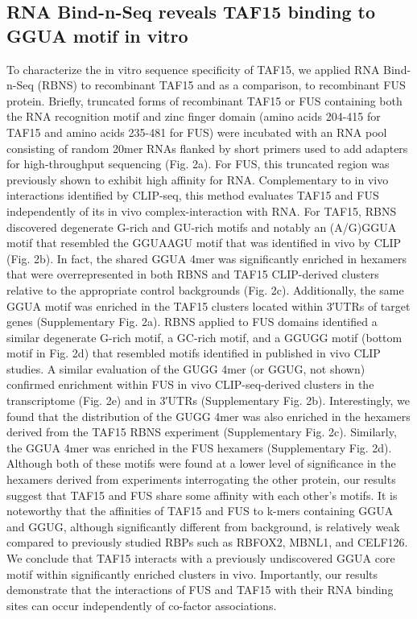 \subsection{RNA Bind-n-Seq reveals TAF15 binding to GGUA motif in vitro}
To characterize the in vitro sequence specificity of TAF15, we applied RNA Bind-n-Seq (RBNS)\cite{Lambert2014} to recombinant TAF15 and as a comparison, to recombinant FUS protein. Briefly, truncated forms of recombinant TAF15 or FUS containing both the RNA recognition motif and zinc finger domain (amino acids 204-415 for TAF15 and amino acids 235-481 for FUS) were incubated with an RNA pool consisting of random 20mer RNAs flanked by short primers used to add adapters for high-throughput sequencing (Fig. 2a). For FUS, this truncated region was previously shown to exhibit high affinity for RNA\cite{Yang2015}. Complementary to in vivo interactions identified by CLIP-seq, this method evaluates TAF15 and FUS independently of its in vivo complex-interaction with RNA. For TAF15, RBNS discovered degenerate G-rich and GU-rich motifs and notably an (A/G)GGUA motif that resembled the GGUAAGU motif that was identified in vivo by CLIP (Fig. 2b). In fact, the shared GGUA 4mer was significantly enriched in hexamers that were overrepresented in both RBNS and TAF15 CLIP-derived clusters relative to the appropriate control backgrounds (Fig. 2c). Additionally, the same GGUA motif was enriched in the TAF15 clusters located within 3′UTRs of target genes (Supplementary Fig. 2a). RBNS applied to FUS domains identified a similar degenerate G-rich motif, a GC-rich motif, and a GGUGG motif (bottom motif in Fig. 2d) that resembled motifs identified in published in vivo CLIP studies\cite{Rogelj2012,Lagier-Tourenne2012}. A similar evaluation of the GUGG 4mer (or GGUG, not shown) confirmed enrichment within FUS in vivo CLIP-seq-derived clusters in the transcriptome (Fig. 2e) and in 3′UTRs (Supplementary Fig. 2b). Interestingly, we found that the distribution of the GUGG 4mer was also enriched in the hexamers derived from the TAF15 RBNS experiment (Supplementary Fig. 2c). Similarly, the GGUA 4mer was enriched in the FUS hexamers (Supplementary Fig. 2d). Although both of these motifs were found at a lower level of significance in the hexamers derived from experiments interrogating the other protein, our results suggest that TAF15 and FUS share some affinity with each other’s motifs. It is noteworthy that the affinities of TAF15 and FUS to k-mers containing GGUA and GGUG, although significantly different from background, is relatively weak compared to previously studied RBPs such as RBFOX2, MBNL1, and CELF126. We conclude that TAF15 interacts with a previously undiscovered GGUA core motif within significantly enriched clusters in vivo. Importantly, our results demonstrate that the interactions of FUS and TAF15 with their RNA binding sites can occur independently of co-factor associations.

